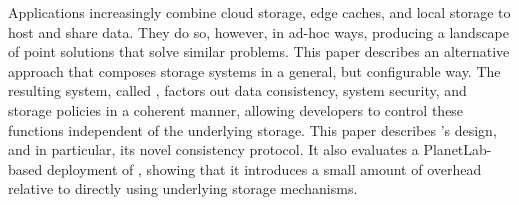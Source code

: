   Applications increasingly combine cloud
storage, edge caches, and local storage to host and share data. They
do so, however, in ad-hoc ways, producing a landscape of point
solutions that solve similar problems. This paper describes an
alternative approach that composes storage systems in a general, but
configurable way. The resulting system, called \Syndicate, factors
out data consistency, system security, and storage policies in a
coherent manner, allowing developers to control these functions
independent of the underlying storage. This paper describes
\Syndicate's design, and in particular, its novel consistency
protocol. It also evaluates a PlanetLab-based deployment of
\Syndicate, showing that it introduces a small amount of overhead
relative to directly using underlying storage mechanisms.
